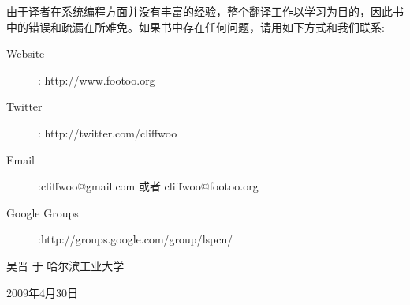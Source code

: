 由于译者在系统编程方面并没有丰富的经验，整个翻译工作以学习为目的，因此书中的错误和疏漏在所难免。如果书中存在任何问题，请用如下方式和我们联系:
\begin{center}
\begin{description}
	\item[Website]: http://www.footoo.org 
	\item[Twitter]: http://twitter.com/cliffwoo
	\item[Email]:\mbox{cliffwoo@gmail.com} 或者 \mbox{cliffwoo@footoo.org}
	\item[Google Groups]:http://groups.google.com/group/lspcn/
\end{description}
\end{center}
\begin{flushright}
	吴晋 于 哈尔滨工业大学\linebreak[2]
	
	2009年4月30日
\end{flushright}
